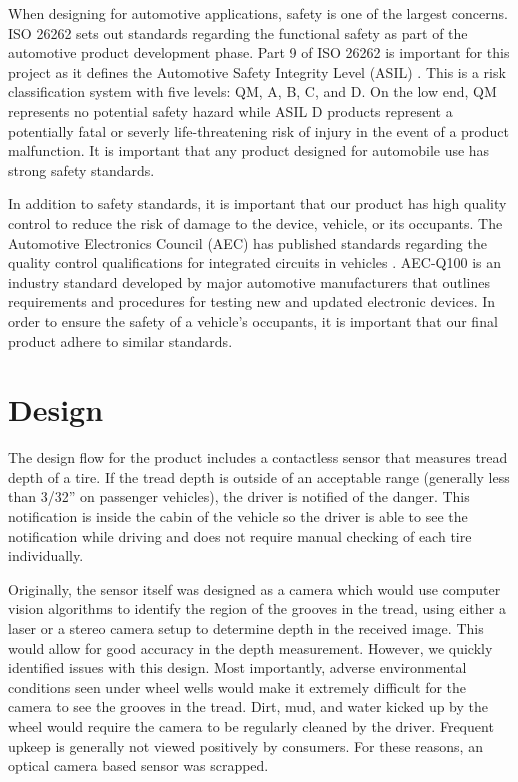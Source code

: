 \documentclass[11pt]{IEEEtran}
\begin{document}
		When designing for automotive applications, safety is one of the largest concerns. ISO 26262 \cite{iso26262} sets out standards regarding the functional safety as part of the automotive product development phase. Part 9 of ISO 26262 is important for this project as it defines the Automotive Safety Integrity Level (ASIL) \cite{asil}. This is a risk classification system with five levels: QM, A, B, C, and D. On the low end, QM represents no potential safety hazard while ASIL D products represent a potentially fatal or severly life-threatening risk of injury in the event of a product malfunction. It is important that any product designed for automobile use has strong safety standards.

		In addition to safety standards, it is important that our product has high quality control to reduce the risk of damage to the device, vehicle, or its occupants. The Automotive Electronics Council (AEC) has published standards regarding the quality control qualifications for integrated circuits in vehicles \cite{aecq100}. AEC-Q100 is an industry standard developed by major automotive manufacturers that outlines requirements and procedures for testing new and updated electronic devices. In order to ensure the safety of a vehicle's occupants, it is important that our final product adhere to similar standards. 


	\section{Design}
		\label{Design}
		The design flow for the product includes a contactless sensor that measures tread depth of a tire. If the tread depth is outside of an acceptable range (generally less than 3/32'' on passenger vehicles), the driver is notified of the danger. This notification is inside the cabin of the vehicle so the driver is able to see the notification while driving and does not require manual checking of each tire individually. 

		Originally, the sensor itself was designed as a camera which would use computer vision algorithms to identify the region of the grooves in the tread, using either a laser or a stereo camera setup to determine depth in the received image. This would allow for good accuracy in the depth measurement. However, we quickly identified issues with this design. Most importantly, adverse environmental conditions seen under wheel wells would make it extremely difficult for the camera to see the grooves in the tread. Dirt, mud, and water kicked up by the wheel would require the camera to be regularly cleaned by the driver. Frequent upkeep is generally not viewed positively by consumers. For these reasons, an optical camera based sensor was scrapped.
\end{document}
